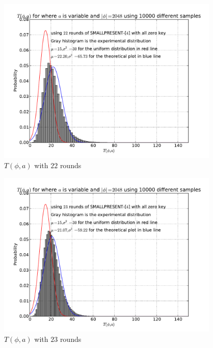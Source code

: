 \begin{figure}[h!]
    \centering
    \includegraphics[width=\textwidth , height = 8cm]{images/T_a_phi_variable_a_variable_phi_22_round_plot}
    \caption{$T(\phi,a)$ with $22$ rounds}
    \label{fig:T_a_phi_variable_a_variable_phi_22_round}
\end{figure}

\begin{figure}[h!]
    \centering
    \includegraphics[width=\textwidth , height = 8cm]{images/T_a_phi_variable_a_variable_phi_23_round_plot}
    \caption{$T(\phi,a)$ with $23$ rounds}
    \label{fig:T_a_phi_variable_a_variable_phi_23_round}
\end{figure}

\iffalse

